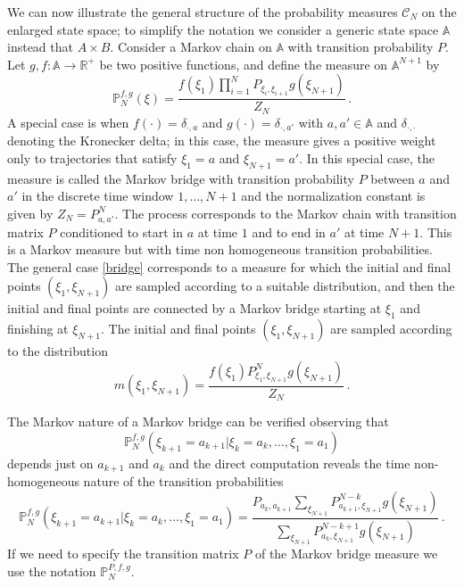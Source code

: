 \documentclass[reqno]{amsart}
\theoremstyle{plain}
\theoremstyle{definition}
\theoremstyle{remark}
\numberwithin{equation}{section}
\numberwithin{theorem}{section}
\newcommand{\<}{\langle}
\renewcommand{\>}{\rangle}
\begin{document}
	We can now illustrate the general structure of the probability measures $\mathcal C_N$ on the enlarged state space;
	to simplify the notation we consider a generic state space $\mathbb A$ instead that $A\times B$.
	Consider a Markov chain on $\mathbb A$ with transition probability
	$P$. Let $g,f: \mathbb A\to \mathbb R^+$ be two positive functions, and define the measure on $\mathbb A^{N+1}$ by
	\begin{equation}\label{bridge}
		\mathbb P_N^{f,g}(\xi)=\frac{f(\xi_1)\prod_{i=1}^NP_{\xi_i,\xi_{i+1}}g(\xi_{N+1})}{Z_N}\,.
	\end{equation}
	A special case is when $f(\cdot)=\delta_{\cdot, a}$ and $g(\cdot)=\delta_{\cdot, a'}$ with $a,a'\in \mathbb A$ and $\delta_{\cdot,\cdot}$ denoting the Kronecker delta; in this case, the measure gives a positive weight only to trajectories that satisfy $\xi_1=a$ and $\xi_{N+1}=a'$. In this special case, the measure is called the Markov bridge with transition probability $P$ between $a$ and $a'$ in the discrete time window $1,\dots ,N+1$ and the normalization constant is given by
	$Z_N=P^N_{a,a'}$. The process corresponds to the Markov chain with transition matrix $P$ conditioned to start in $a$ at time $1$ and to end in $a'$ at time $N+1$. This is a Markov measure but with time non homogeneous transition probabilities. The general case \eqref{bridge} corresponds to a measure for which the initial and final points $(\xi_1,\xi_{N+1})$ are sampled according to a suitable distribution, and then the initial and final points are connected by a Markov bridge starting at $\xi_1$ and finishing at $\xi_{N+1}$.
	The initial and final points $(\xi_1,\xi_{N+1})$ are sampled according to the distribution 
	\begin{equation}\label{mbr}
		m(\xi_1,\xi_{N+1})=\frac{f(\xi_1)P^N_{\xi_1,\xi_{N+1}}g(\xi_{N+1})}{Z_N}\,.
	\end{equation}
	
	The Markov nature of a Markov bridge can be verified observing that 
	$$\mathbb P_N^{f,g}\left(\xi_{k+1}=a_{k+1}|\xi_{k}=a_k, \dots, \xi_1=a_1\right)$$ depends just on $a_{k+1}$ and $a_k$ and the direct computation reveals the time non-homogeneous nature of the transition probabilities
	\begin{equation}
		\mathbb P_N^{f,g}\left(\xi_{k+1}=a_{k+1}|\xi_{k}=a_k, \dots, \xi_1=a_1\right)=\frac{P_{a_k,a_{k+1}}\sum_{\xi_{N+1}}P^{N-k}_{a_{k+1},\xi_{N+1}}g(\xi_{N+1})}{\sum_{\xi_{N+1}}P^{N-k+1}_{a_{k},\xi_{N+1}}g(\xi_{N+1})}\,.
	\end{equation}
	If we need to specify the transition matrix $P$ of the Markov bridge measure we use the notation $\mathbb P_N^{P,f,g}$.
	
\end{document}

